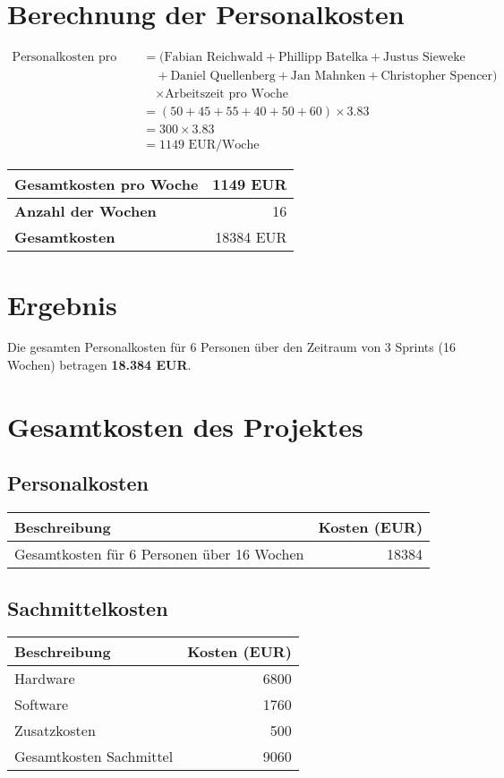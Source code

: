 \section*{Berechnung der Personalkosten}
\[
  \begin{aligned}
    \text{Personalkosten pro Woche} &= (\text{Fabian Reichwald} + \text{Phillipp Batelka} + \text{Justus Sieweke} \\
    &\quad + \text{Daniel Quellenberg} + \text{Jan Mahnken} + \text{Christopher Spencer}) \\
    &\quad \times \text{Arbeitszeit pro Woche} \\
    &= (50 + 45 + 55 + 40 + 50 + 60) \times 3.83 \\
    &= 300 \times 3.83 \\
    &= 1149 \text{ EUR/Woche}
  \end{aligned}
\]

\begin{tabular}{lr}
  \toprule
  \textbf{Gesamtkosten pro Woche} & 1149 EUR \\
  \midrule
  \textbf{Anzahl der Wochen} & 16 \\
  \midrule
  \textbf{Gesamtkosten} & 18384 EUR \\
  \bottomrule
\end{tabular}

\section*{Ergebnis}
Die gesamten Personalkosten für 6 Personen über den Zeitraum von 3 Sprints (16 Wochen) betragen \textbf{18.384 EUR}.

\section*{Gesamtkosten des Projektes}

\subsection*{Personalkosten}
\begin{tabular}{lr}
  \toprule
  \textbf{Beschreibung} & \textbf{Kosten (EUR)} \\
  \midrule
  Gesamtkosten für 6 Personen über 16 Wochen & 18384 \\
  \bottomrule
\end{tabular}

\subsection*{Sachmittelkosten}
\begin{tabular}{lr}
  \toprule
  \textbf{Beschreibung} & \textbf{Kosten (EUR)} \\
  \midrule
  Hardware & 6800 \\
  Software & 1760 \\
  Zusatzkosten & 500 \\
  \midrule
  Gesamtkosten Sachmittel & 9060 \\
  \bottomrule
\end{tabular}

